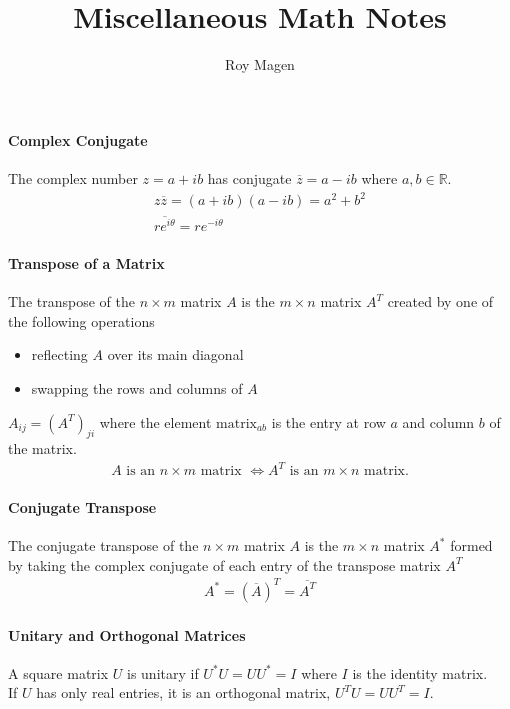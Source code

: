\documentclass{article}
\title{Miscellaneous Math Notes}
\author{Roy Magen}
\date{ }
\begin{document}
	
	\begin{titlepage} \maketitle \end{titlepage}

	\paragraph{Complex Conjugate}
		The complex number $ z = a + ib $ has conjugate $ \overline{z} = a - ib
		$ where $ a,b \in \mathbb{R} $.
		\begin{gather}
			z \overline{z} = (a + ib)(a - ib) = a^2 + b^2 \\
			\overline{re^{i \theta}} = re^{-i \theta}
		\end{gather}

	\paragraph{Transpose of a Matrix}
		The transpose of the $ n \times m $ matrix $ A $ is the $ m \times n $ matrix $ A^T $ created by one of the
		following operations
		\begin{itemize}
			\item reflecting $ A $ over its main diagonal
			\item swapping the rows and columns of $ A $
		\end{itemize}
		$ A_{ij} = \left( A^T \right)_{ji} $ where the
		element $ \text{matrix}_{ab} $ is the entry at row $ a $
		and column $ b $ of the matrix.
		\begin{gather}
			A \text{ is an } n \times m \text{ matrix } \iff A^T \text{ is an }
			m \times n \text{ matrix.}
		\end{gather}

	\paragraph{Conjugate Transpose}
		The conjugate transpose of the $ n \times m $ matrix $ A $ is the $ m
		\times n $ matrix $ A^* $ formed by taking the complex conjugate of each
		entry of the transpose matrix $ A^T $
		\begin{gather}
			A^* = \left( \overline{A} \right)^T = \overline{A^T}
		\end{gather}
	
	\paragraph{Unitary and Orthogonal Matrices}
		A square matrix $ U $ is unitary if $ U^*U = UU^* = I $ where $ I $ is
		the identity matrix. \\
		If $ U $ has only real entries, it is an orthogonal matrix, $ U^TU =
		UU^T = I $.
\end{document}
